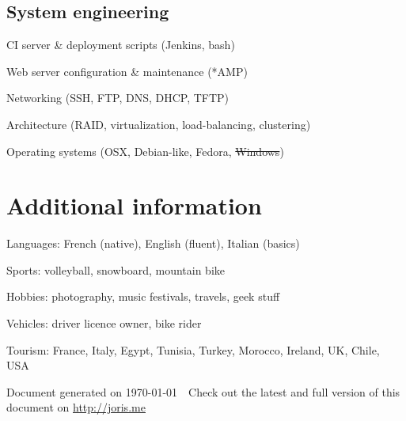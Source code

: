 \documentclass[letterpaper]{article}
\def\footerlink{http://joris.me}
\renewenvironment{itemize}{
    \begin{list}{}{
        \setlength{\leftmargin}{1.5em}
    }
}{
    \end{list}
}
\begin{document}
        \subsection*{System engineering}
            
            \begin{itemize}
                \item CI server \& deployment scripts (Jenkins, bash) 
                \item Web server configuration \& maintenance (*AMP)
                \item Networking (SSH, FTP, DNS, DHCP, TFTP)
                \item Architecture (RAID, virtualization, load-balancing, clustering)
                \item Operating systems (OSX, Debian-like, Fedora, \sout{Windows})
            \end{itemize}
            
    \section*{Additional information}
    
        \begin{itemize}
            \item Languages: French (native), English (fluent), Italian (basics)
            \item Sports: volleyball, snowboard, mountain bike
            \item Hobbies: photography, music festivals, travels, geek stuff
            \item Vehicles: driver licence owner, bike rider
            \item Tourism: France, Italy, Egypt, Tunisia, Turkey, Morocco, Ireland, UK, Chile, USA
        \end{itemize}
        
    \vfill
    
    \begin{center}
        \begin{footnotesize}
            Document generated on \today \ \textendash\ Check out the latest and full version of this document on \uline{\href{\footerlink}{ \footerlink}}
        \end{footnotesize}
    \end{center}
\end{document}
